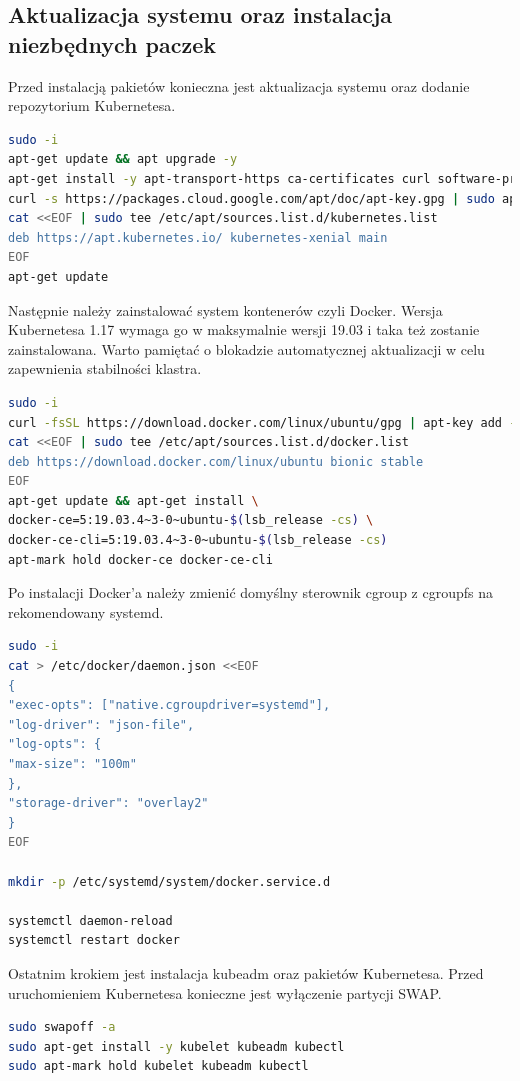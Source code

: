 \documentclass[pl,final,oneside]{mgr} %
\begin{document}
\subsection{Aktualizacja systemu oraz instalacja niezbędnych paczek}
Przed instalacją pakietów konieczna jest aktualizacja systemu oraz dodanie repozytorium Kubernetesa.
\begin{lstlisting}[language=Bash]
sudo -i
apt-get update && apt upgrade -y
apt-get install -y apt-transport-https ca-certificates curl software-properties-common
curl -s https://packages.cloud.google.com/apt/doc/apt-key.gpg | sudo apt-key add -
cat <<EOF | sudo tee /etc/apt/sources.list.d/kubernetes.list
deb https://apt.kubernetes.io/ kubernetes-xenial main
EOF
apt-get update
\end{lstlisting}

Następnie należy zainstalować system kontenerów czyli Docker. Wersja Kubernetesa 1.17 wymaga go w maksymalnie wersji 19.03 i taka też zostanie zainstalowana. Warto pamiętać o blokadzie automatycznej aktualizacji w celu zapewnienia stabilności klastra.

\begin{lstlisting}[language=Bash]
sudo -i
curl -fsSL https://download.docker.com/linux/ubuntu/gpg | apt-key add -
cat <<EOF | sudo tee /etc/apt/sources.list.d/docker.list
deb https://download.docker.com/linux/ubuntu bionic stable
EOF
apt-get update && apt-get install \
docker-ce=5:19.03.4~3-0~ubuntu-$(lsb_release -cs) \
docker-ce-cli=5:19.03.4~3-0~ubuntu-$(lsb_release -cs)
apt-mark hold docker-ce docker-ce-cli
\end{lstlisting}	
Po instalacji Docker'a należy zmienić domyślny sterownik cgroup z cgroupfs na rekomendowany systemd. 
\begin{lstlisting}[language=Bash]
sudo -i
cat > /etc/docker/daemon.json <<EOF
{
"exec-opts": ["native.cgroupdriver=systemd"],
"log-driver": "json-file",
"log-opts": {
"max-size": "100m"
},
"storage-driver": "overlay2"
}
EOF

mkdir -p /etc/systemd/system/docker.service.d

systemctl daemon-reload
systemctl restart docker
\end{lstlisting}
Ostatnim krokiem jest instalacja kubeadm oraz pakietów Kubernetesa. Przed uruchomieniem Kubernetesa konieczne jest wyłączenie partycji SWAP.
\begin{lstlisting}[language=Bash]
sudo swapoff -a
sudo apt-get install -y kubelet kubeadm kubectl
sudo apt-mark hold kubelet kubeadm kubectl
\end{lstlisting}
\end{document}
